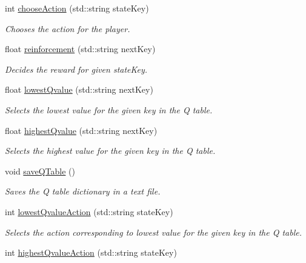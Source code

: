 \begin{DoxyCompactItemize}
int \mbox{\hyperlink{classQLearning_ab3c02f950f417a08a7360779d05145e2}{choose\+Action}} (std\+::string state\+Key)
\begin{DoxyCompactList}\small\item\em Chooses the action for the player. \end{DoxyCompactList}\item 
float \mbox{\hyperlink{classQLearning_acb9b1ecb8b84f0b8b3cf8acb809fe7c3}{reinforcement}} (std\+::string next\+Key)
\begin{DoxyCompactList}\small\item\em Decides the reward for given state\+Key. \end{DoxyCompactList}\item 
float \mbox{\hyperlink{classQLearning_a2ec75be948cae6812f4b752d58cd94c4}{lowest\+Qvalue}} (std\+::string next\+Key)
\begin{DoxyCompactList}\small\item\em Selects the lowest value for the given key in the Q table. \end{DoxyCompactList}\item 
float \mbox{\hyperlink{classQLearning_a0e5da71daa52de437939616fe539b2ba}{highest\+Qvalue}} (std\+::string next\+Key)
\begin{DoxyCompactList}\small\item\em Selects the highest value for the given key in the Q table. \end{DoxyCompactList}\item 
\mbox{\label{classQLearning_ae8203d4fe9a77dfa2f0558be42dac02a}} 
void \mbox{\hyperlink{classQLearning_ae8203d4fe9a77dfa2f0558be42dac02a}{save\+Q\+Table}} ()
\begin{DoxyCompactList}\small\item\em Saves the Q table dictionary in a text file. \end{DoxyCompactList}\item 
int \mbox{\hyperlink{classQLearning_a53aefdab5c6376dc6bc14da2a4d65c4e}{lowest\+Qvalue\+Action}} (std\+::string state\+Key)
\begin{DoxyCompactList}\small\item\em Selects the action corresponding to lowest value for the given key in the Q table. \end{DoxyCompactList}\item 
int \mbox{\hyperlink{classQLearning_a5bf153ecf20717e883b780204e045a09}{highest\+Qvalue\+Action}} (std\+::string state\+Key)

\end{DoxyCompactItemize}
